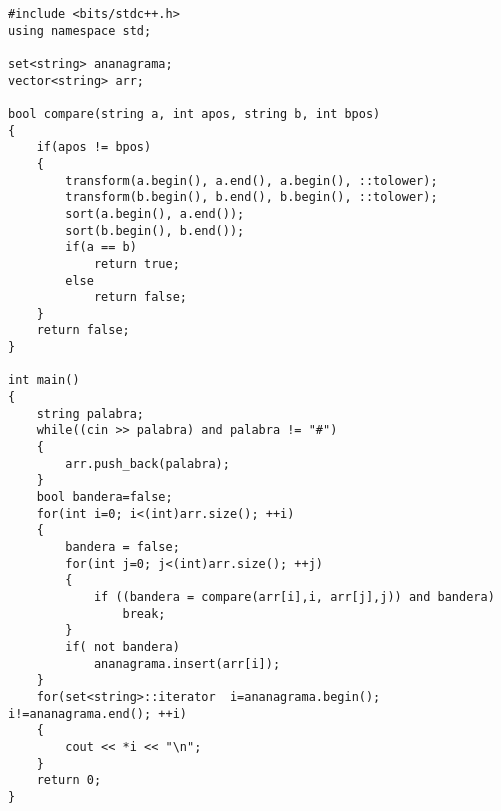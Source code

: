 \begin{verbatim}
#include <bits/stdc++.h>
using namespace std;

set<string> ananagrama;
vector<string> arr;

bool compare(string a, int apos, string b, int bpos)
{
    if(apos != bpos)
    {
        transform(a.begin(), a.end(), a.begin(), ::tolower);
        transform(b.begin(), b.end(), b.begin(), ::tolower);
        sort(a.begin(), a.end());
        sort(b.begin(), b.end());
        if(a == b)
            return true;
        else
            return false;
    }
    return false;
}

int main()
{
    string palabra;
    while((cin >> palabra) and palabra != "#")
    {
        arr.push_back(palabra);
    }
    bool bandera=false;
    for(int i=0; i<(int)arr.size(); ++i)
    {
        bandera = false;
        for(int j=0; j<(int)arr.size(); ++j)
        {
            if ((bandera = compare(arr[i],i, arr[j],j)) and bandera)
                break;
        }
        if( not bandera)
            ananagrama.insert(arr[i]);
    }
    for(set<string>::iterator  i=ananagrama.begin(); i!=ananagrama.end(); ++i)
    {
        cout << *i << "\n";
    }
    return 0;
}

\end{verbatim}
